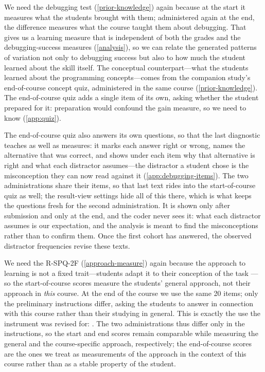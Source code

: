 We need the debugging test (\cref{prior-knowledge}) again because at
the start it measures what the students brought with them; administered
again at the end, the difference measures what the course taught them
about debugging.
That gives us a learning measure that is independent of both the
grades and the debugging-success measures (\cref{analysis}), so we can
relate the generated patterns of variation not only to debugging success
but also to how much the student learned about the skill itself.
The conceptual counterpart---what the students learned about the
programming concepts---comes from the companion study's end-of-course
concept quiz, administered in the same course (\cref{prior-knowledge}).
The end-of-course quiz adds a single item of its own, asking whether the
student prepared for it: preparation would confound the gain
measure, so we need to know (\cref{app:quiz}).

The end-of-course quiz also answers its own questions, so that the last
diagnostic teaches as well as measures: it marks each answer right or
wrong, names the alternative that was correct, and shows under each
item why that alternative is right and what each distractor
assumes---the distractor a student chose is the misconception they can
now read against it (\cref{app:debugging-items}).
The two administrations share their items, so that last text rides into
the start-of-course quiz as well; the result-view settings hide all of
this there, which is what keeps the questions fresh for the second
administration.
It is shown only after submission and only at the end, and the coder
never sees it: what each distractor assumes is our expectation, and the
analysis is meant to find the misconceptions rather than to confirm
them.
Once the first cohort has answered, the observed distractor frequencies
revise these texts.

We need the R-SPQ-2F (\cref{approach-measure}) again because the approach
to learning is not a fixed trait---students adapt it to their conception of the task
\autocite{MartonSaljo1976II}---so the start-of-course scores measure the
students' general approach, not their approach in \emph{this} course.
At the end of the course we use the same 20 items; only the preliminary
instructions differ, asking the students to answer in connection with this
course rather than their studying in general.
This is exactly the use the instrument was revised for:
.
The two administrations thus differ only in the instructions, so the start
and end scores remain comparable while measuring the general and the
course-specific approach, respectively; the end-of-course scores are the
ones we treat as measurements of the approach in the context of this
course rather than as a stable property of the student.

